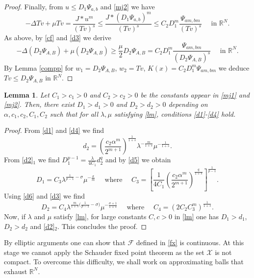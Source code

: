 \documentclass[leqno,12pt]{article}
\newcommand{\R}{\mathbb R}
\newtheorem{lemma}[theorem]{Lemma}
\numberwithin{equation}{section}
\begin{document}
\begin{proof}
Finally, from $u\leq D_1 \Psi_{a,b}$ and \eqref{mj2} we have
$$
-\Delta Tv+\mu Tv =\frac{J*u^m}{(Tv)^s}\leq \frac{J*(D_1\Psi_{a,b})^m}{(Tv)^s}
\leq C_2D_1^m 
\frac{\Psi_{am,bm}}{(Tv)^s} \quad\mbox{ in }\R^N.
$$
As above, by \eqref{cf} and \eqref{d3} we derive
$$
-\Delta (D_2\Psi_{A,B})+\mu (D_2\Psi_{A,B}) \geq \frac{\mu}{2} D_2 \Psi_{A,B}= C_2 D_1^m 
\frac{\Psi_{am,bm}}{(D_2 \Psi_{A,B})^s} \quad\mbox{ in }\R^N.
$$
By Lemma \ref{compp} for $w_1=D_2 \Psi_{A,B}$, $w_2=Tv$,  $K(x)=C_2 D_1^m \Psi_{am,bm}$ we deduce $Tv\leq D_2 \Psi_{A,B}$ in $\R^N$.

\end{proof}



\begin{lemma}\label{lconst2}
Let $C_1>c_1>0$ and $C_2>c_2>0$ be the constants appear in \eqref{mj1} and \eqref{mj2}. 
Then, there exist $D_1>d_1>0$ and $D_2>d_2>0$ depending on $\alpha,c_1,c_2, C_1, C_2$ such that for all $\lambda, \mu$ satisfying \eqref{lm}, conditions \eqref{d1}-\eqref{d4} hold.
\end{lemma}
\begin{proof}
From \eqref{d1} and \eqref{d4} we find 
\begin{equation}\label{d5}
d_2=\left(\frac{c_2\alpha^m}{2^{m+1}} \right)^{\frac{1}{1+s}}\lambda^{-\frac{m}{1+s}}\mu^{-\frac{1}{1+s}}.
\end{equation}
From \eqref{d2}$_1$ we find $D_1^{p-1}=\frac{\lambda}{4C_1}d_2^q$ and by \eqref{d5} we obtain
\begin{equation}\label{d6}
D_1=C_3 \lambda^{\frac{1}{p-1}-\sigma }\mu^{-\frac{\sigma}{m}}\quad\mbox{ where }\quad C_3=\left[\frac{1}{4C_1} \left(\frac{c_2\alpha^m}{2^{m+1}} \right)^{\frac{q}{1+s}} \right]^{\frac{1}{p-1}}.
\end{equation}
Using \eqref{d6} and \eqref{d3} we find 
\begin{equation}\label{d7}
D_2=C_4 \lambda^{\frac{m}{1+s}\big(\frac{1}{p-1}-\sigma\big) }\mu^{-\frac{\sigma+1}{1+s}}\quad\mbox{ where }\quad C_4=(2C_2C_3^m)^{\frac{1}{1+s}}.
\end{equation}
Now, if $\lambda$ and $\mu$ satisfy \eqref{lm}, for large constants $C,c>0$ in \eqref{lm} one has $D_1>d_1$, $D_2>d_2$ and \eqref{d2}$_2$. This concludes the proof.
\end{proof}
By elliptic arguments one can show that $\mathscr{F}$ defined in \eqref{fx} is continuous. 
At this stage we cannot apply the Schauder fixed point theorem as the set $\mathscr{X}$ is not compact. To overcome this difficulty, we shall work on approximating balls that exhaust $\R^N$.
\end{document}
